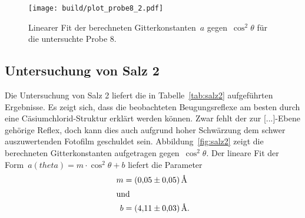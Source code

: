 \begin{figure}[htb]
  \centering
  \texttt{[image: build/plot\_probe8\_2.pdf]}
  \caption{Linearer Fit der berechneten Gitterkonstanten~$a$
  gegen~$\cos^2\theta$ für die untersuchte Probe 8.}
  \label{fig:probe8}
\end{figure}

\subsection{Untersuchung von Salz 2}

Die Untersuchung von Salz 2 liefert die in Tabelle~\ref{tab:salz2}
aufgeführten Ergebnisse. Es zeigt sich, dass die beobachteten Beugungsreflexe
am besten durch eine Cäsiumchlorid-Struktur erklärt werden können. Zwar fehlt
der zur [...]-Ebene gehörige Reflex, doch kann dies auch aufgrund hoher
Schwärzung dem schwer auszuwertenden Fotofilm geschuldet sein.
Abbildung~\ref{fig:salz2} zeigt die berechneten Gitterkonstanten aufgetragen
gegen~$\cos^2{\theta}$. Der lineare Fit der
Form~$a(theta)=m\cdot\cos^2{\theta}+b$ liefert die Parameter
%
\begin{align}
  m&=\SI{0.05(5)}{\angstrom} \\
  \shortintertext{und}
  b&=\SI{4.11(3)}{\angstrom}. %
\end{align}

